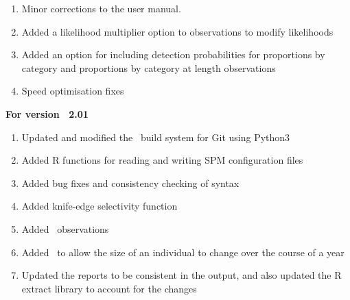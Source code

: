 \begin{enumerate}
  \item Minor corrections to the user manual.
	\item Added a likelihood multiplier option to observations to modify likelihoods
	\item Added an option for including detection probabilities for proportions by category and proportions by category at length observations
	\item Speed optimisation fixes
\end{enumerate}

\textbf{For version \SPM\ 2.01}

\begin{enumerate}
  \item Updated and modified the \SPM\ build system for Git using Python3
  \item Added R functions for reading and writing SPM configuration files
	\item Added bug fixes and consistency checking of syntax
	\item Added knife-edge selectivity function
  \item Added\  observations
  \item Added\  to allow the size of an individual to change over the course of a year
  \item Updated the reports to be consistent in the output, and also updated the R extract library to account for the changes
\end{enumerate}


